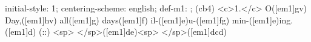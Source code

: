 initial-style: 1;
centering-scheme: english;
def-m1: \grealign;
(cb4) <c>1.</c> O([em1]gv) Day,([em1]hv) all([em1]g) days([em1]f) il-([em1]e)u-([em1]fg) min-([em1]e)ing.([em1]d) (::) <sp> </sp>([em1]de)<sp> </sp>([em1]dcd)